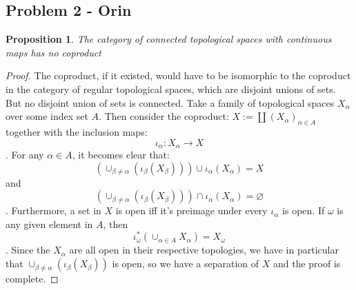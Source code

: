 \documentclass{article}
\newtheorem{proposition}[subsection]{Proposition}
\begin{document}
\subsection{Problem 2 - Orin}
\begin{proposition}
	The category of connected topological spaces with continuous maps has no coproduct
\end{proposition}
\begin{proof}
	The coproduct, if it existed, would have to be isomorphic to the coproduct in the category of regular topological spaces, which are disjoint unions of sets.  But no disjoint union of sets is connected.  Take a family of topological spaces $X_\alpha$ over some index set $A$.  Then consider the coproduct: $X := \coprod(X_\alpha)_{\alpha\in A}$ together with the inclusion maps: $$\iota_\alpha: X_\alpha\to X$$.  For any $\alpha\in A$, it becomes clear that:
	$$(\cup_{\beta\neq\alpha}(\iota_\beta(X_\beta)))\cup \iota_\alpha(X_\alpha) = X$$ and
	$$(\cup_{\beta\neq\alpha}(\iota_\beta(X_\beta)))\cap \iota_\alpha(X_\alpha) = \varnothing$$.  Furthermore, a set in $X$ is open iff it's preimage under every $\iota_\alpha$ is open.  If $\omega$ is any given element in $A$, then
	$$\iota_\omega^*(\cup_{\alpha\in A}X_\alpha)=X_\omega$$. Since the $X_\alpha$ are all open in their respective topologies, we have in particular that $\cup_{\beta\neq\alpha}(\iota_\beta(X_\beta))$ is open, so we have a separation of $X$ and the proof is complete.
\end{proof}
\end{document}
